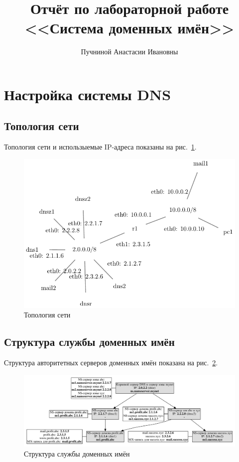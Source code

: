 \documentclass[a4paper,12pt]{article}
\title{Отчёт по лабораторной работе \\ <<Система доменных имён>>}
\author{Пучниной Анастасии Ивановны}
\begin{document}
\maketitle

\tableofcontents

\section{Настройка системы DNS}

\subsection{Топология сети}

Топология сети и использыемые IP-адреса показаны на рис.~\ref{fig:network}.

\begin{figure}
\centering
\includegraphics[width=\textwidth]{includes/network_gv.pdf}
\caption{Топология сети}
\label{fig:network}
\end{figure}

\subsection{Структура службы доменных имён}

Структура авторитетных серверов доменных имён показана на рис.~\ref{fig:dns}.

\begin{figure}
\centering
\includegraphics[width=\textwidth]{includes/dns_gv.pdf}
\caption{Структура службы доменных имён}
\label{fig:dns}
\end{figure}
\end{document}
